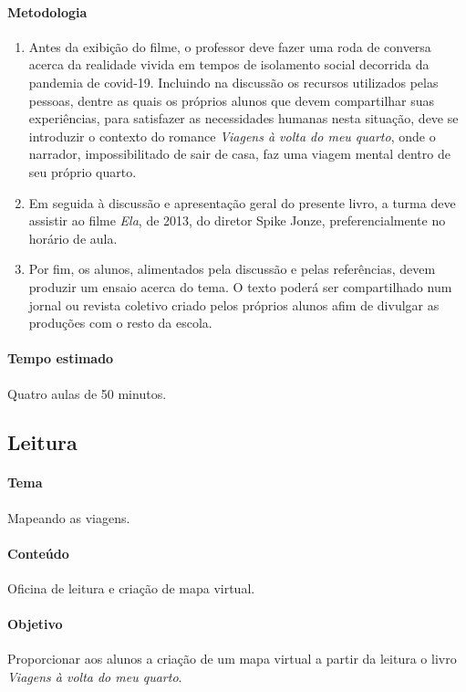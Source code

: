\documentclass[12pt]{extarticle}
\begin{document}
\paragraph{Metodologia}
\begin{enumerate}
	\item
	Antes da exibição do filme, o professor deve fazer uma roda de conversa acerca 
	da realidade vivida em tempos de isolamento social decorrida da pandemia 
	de covid-19. Incluindo na discussão os recursos utilizados pelas
	pessoas, dentre as quais os próprios alunos que devem compartilhar suas
	experiências, para satisfazer as necessidades humanas nesta situação, 
	deve se introduzir o contexto do romance \emph{Viagens à volta do meu quarto},
	onde o narrador, impossibilitado de sair de casa, faz uma viagem 
	mental dentro de seu próprio quarto. 
	\item
	Em seguida à discussão e apresentação geral do presente livro, a turma deve assistir 
	ao filme \emph{Ela}, de 2013, do diretor Spike Jonze, preferencialmente no horário de aula. 
	\item
	Por fim, os alunos, alimentados pela discussão e pelas referências, devem produzir 
	um ensaio acerca do tema. O texto poderá ser compartilhado num jornal ou revista
	coletivo criado pelos próprios alunos afim de divulgar as produções 
	com o resto da escola.
\end{enumerate}

\paragraph{Tempo estimado} Quatro aulas de 50 minutos.


\subsection{Leitura}

\paragraph{Tema} Mapeando as viagens.

\paragraph{Conteúdo} Oficina de leitura e criação de mapa virtual.

\paragraph{Objetivo} Proporcionar aos alunos a criação de um mapa virtual
a partir da leitura o livro \emph{Viagens à volta do meu quarto}.
\end{document}

